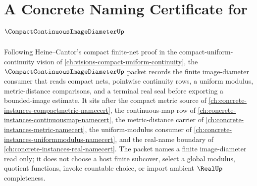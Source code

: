\chapter{A Concrete Naming Certificate for $\CompactContinuousImageDiameterUp$}
\label{ch:concrete-instances-compact-continuous-image-diameter-namecert}

Following Heine--Cantor's compact finite-net proof in the compact-uniform-continuity vision of \autoref{ch:visions-compact-uniform-continuity}, the $\CompactContinuousImageDiameterUp$ packet records the finite image-diameter consumer that reads compact nets, pointwise continuity rows, a uniform modulus, metric-distance comparisons, and a terminal real seal before exporting a bounded-image estimate. It sits after the compact metric source of \autoref{ch:concrete-instances-compactmetric-namecert}, the continuous-map row of \autoref{ch:concrete-instances-continuousmap-namecert}, the metric-distance carrier of \autoref{ch:concrete-instances-metric-namecert}, the uniform-modulus consumer of \autoref{ch:concrete-instances-uniformmodulus-namecert}, and the real-name boundary of \autoref{ch:concrete-instances-real-namecert}. The packet names a finite image-diameter read only; it does not choose a host finite subcover, select a global modulus, quotient functions, invoke countable choice, or import ambient $\RealUp$ completeness.

